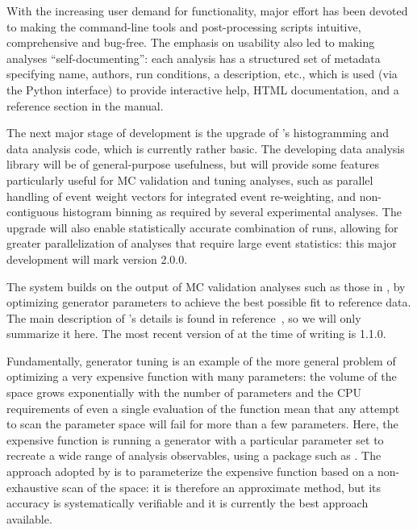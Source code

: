With the increasing user demand for \rivet functionality, major effort has been
devoted to making the command-line tools and post-processing scripts intuitive,
comprehensive and bug-free. The emphasis on usability also led to making \rivet
analyses ``self-documenting'': each analysis has a structured set of metadata
specifying name, authors, run conditions, a description, etc., which is used
(via the Python interface) to provide interactive help, HTML documentation, and
a reference section in the \rivet manual.

The next major stage of development is the upgrade of \rivet's histogramming and
data analysis code, which is currently rather basic. The developing data
analysis library will be of general-purpose usefulness, but will provide some
features particularly useful for MC validation and tuning analyses, such as
parallel handling of event weight vectors for integrated event re-weighting, and
non-contiguous histogram binning as required by several experimental analyses.
The upgrade will also enable statistically accurate combination of runs,
allowing for greater parallelization of \rivet analyses that require large
event statistics: this major development will mark \rivet version 2.0.0.


\mcsubsection{\professor}
\label{sec:professor}

The \professor system builds on the output of MC validation analyses such as
those in \rivet, by optimizing generator parameters to achieve the best possible
fit to reference data. The main description of \professor's details is found in
reference~\cite{Buckley:2009bj}, so we will only summarize it here. The most
recent version of \professor at the time of writing is 1.1.0.

Fundamentally, generator tuning is an example of the more general problem of
optimizing a very expensive function with many parameters: the volume of the
space grows exponentially with the number of parameters and the CPU requirements
of even a single evaluation of the function mean that any attempt to scan the
parameter space will fail for more than a few parameters. Here, the expensive
function is running a generator with a particular parameter set to recreate a
wide range of analysis observables, using a package such as \rivet. The approach
adopted by \professor is to parameterize the expensive function based on a
non-exhaustive scan of the space: it is therefore an approximate method, but its
accuracy is systematically verifiable and it is currently the best approach available.

